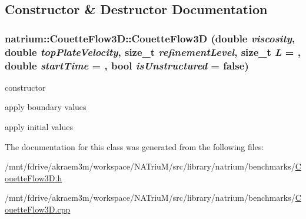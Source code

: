 \subsection{Constructor \& Destructor Documentation}
\hypertarget{classnatrium_1_1CouetteFlow3D_acf083268f4190ffe62b01f3dfc77d407}{
\subsubsection[{CouetteFlow3D}]{\setlength{\rightskip}{0pt plus 5cm}natrium::CouetteFlow3D::CouetteFlow3D (double {\em viscosity}, \/  double {\em topPlateVelocity}, \/  size\_\-t {\em refinementLevel}, \/  size\_\-t {\em L} = {}, \/  double {\em startTime} = {}, \/  bool {\em isUnstructured} = {\ttfamily false})}}
\label{classnatrium_1_1CouetteFlow3D_acf083268f4190ffe62b01f3dfc77d407}


constructor 

apply boundary values

apply initial values 

The documentation for this class was generated from the following files:\begin{DoxyCompactItemize}
\item 
/mnt/fdrive/akraem3m/workspace/NATriuM/src/library/natrium/benchmarks/\hyperlink{CouetteFlow3D_8h}{CouetteFlow3D.h}\item 
/mnt/fdrive/akraem3m/workspace/NATriuM/src/library/natrium/benchmarks/\hyperlink{CouetteFlow3D_8cpp}{CouetteFlow3D.cpp}\end{DoxyCompactItemize}

